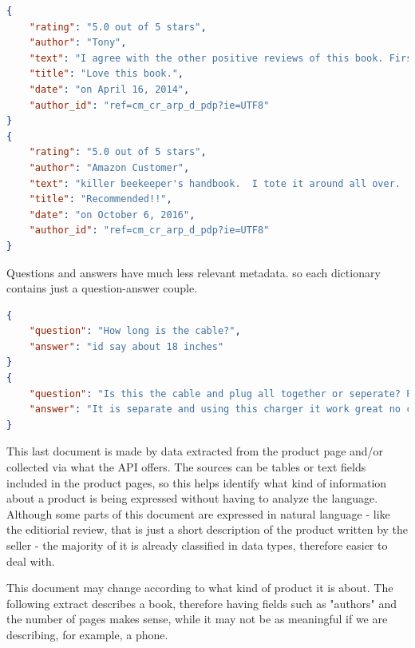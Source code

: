 \documentclass[LaM,oneside,binding=0.6cm]{sapthesis}
\begin{document}
\begin{lstlisting}[language=json,firstnumber=1]
{
	"rating": "5.0 out of 5 stars", 
	"author": "Tony", 
	"text": "I agree with the other positive reviews of this book. First, it provides a lot of useful information. All of my questions were answered in this book, and then some. Second, it's just a high quality, good looking book. If you read this book and you are not sure you want to be a beekeeper, you should probably decide not to be a beekeeper.", 
	"title": "Love this book.", 
	"date": "on April 16, 2014", 
	"author_id": "ref=cm_cr_arp_d_pdp?ie=UTF8"
}
{
	"rating": "5.0 out of 5 stars", 
	"author": "Amazon Customer", 
	"text": "killer beekeeper's handbook.  I tote it around all over.  Has helped me gain much knowledge for my new hive!  Recommended!!", 
	"title": "Recommended!!", 
	"date": "on October 6, 2016", 
	"author_id": "ref=cm_cr_arp_d_pdp?ie=UTF8"
}
\end{lstlisting}

Questions and answers have much less relevant metadata. so each dictionary contains just a question-answer couple.

\begin{lstlisting}[language=json,firstnumber=1]
{
	"question": "How long is the cable?",
	"answer": "id say about 18 inches" 
}
{
	"question": "Is this the cable and plug all together or seperate? Picture shows cable and box, then one together which doesn't come apart?",
	"answer": "It is separate and using this charger it work great no complaints happy with product."
}
\end{lstlisting}

This last document is made by data extracted from the product page and/or collected via what the API offers. 
The sources can be tables or text fields included in the product pages, so this helps identify what kind of information about a product is being expressed without having to analyze the language. Although some parts of this document are expressed in natural language - like the editiorial review, that is just a short description of the product written by the seller - the majority of it is already classified in data types, therefore easier to deal with.

This document may change according to what kind of product it is about. The following extract describes a book, therefore having fields such as "authors" and the number of pages makes sense, while it may not be as meaningful if we are describing, for example, a phone.
\end{document}
